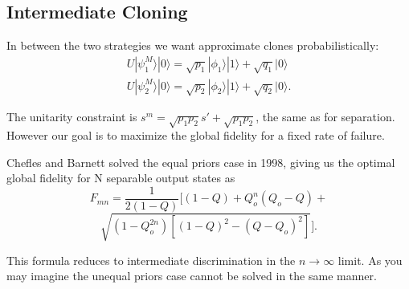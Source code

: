 \documentclass{beamer}
\newcommand{\ke}[1]{|#1\rangle}
\begin{document}
\subsection{Intermediate Cloning}
\begin{frame}
In between the two strategies we want approximate clones probabilistically:
\begin{eqnarray}
U \ke{\psi_1^M} \ke 0 = \sqrt{p_1} \ke {\phi_1} \ke 1 + \sqrt{q_1} \ke 0\\
U \ke{\psi_2^M} \ke 0 = \sqrt{p_2} \ke {\phi_2} \ke 1 + \sqrt{q_2} \ke 0 .
\end{eqnarray}

The unitarity constraint is $s^m = \sqrt{p_1 p_2} s' + \sqrt{p_1 p_2}$, the same as for separation.  However
our goal is to maximize the global fidelity for a fixed rate of failure.
\end{frame}
\begin{frame}
Chefles and Barnett solved the equal priors case in 1998, giving us the optimal global fidelity for N separable output states as 
\[F_{mn}  =\frac{1}{2\left(1-Q\right)}[(1-Q)+Q_{o}^{n}(Q_{o}-Q)+\]
\[\sqrt{(1-Q_{o}^{2n})\left[(1-Q)^{2}-(Q-Q_{o})^{2}\right]}].\]

This formula reduces to intermediate discrimination in the $n \rightarrow \infty$ limit.
As you may imagine the unequal priors case cannot be solved in the same manner.  
\end{frame}
\end{document}
